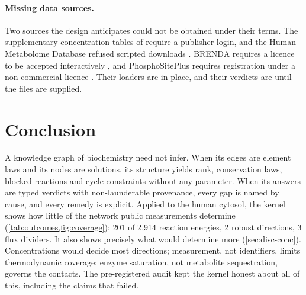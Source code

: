 \paragraph{Missing data sources.}
Two sources the design anticipates could not be obtained under their terms.
The supplementary concentration tables of \citet{park2016concentrations} require a publisher login, and the Human Metabolome Database refused scripted downloads \citep{wishart2022hmdb}.
BRENDA requires a licence to be accepted interactively \citep{chang2021brenda}, and PhosphoSitePlus requires registration under a non-commercial licence \citep{hornbeck2015psp}.
Their loaders are in place, and their verdicts are  until the files are supplied.

\section{Conclusion}
\label{sec:conclusion}

A knowledge graph of biochemistry need not infer.
When its edges are element laws and its nodes are solutions, its structure yields rank, conservation laws, blocked reactions and cycle constraints without any parameter.
When its answers are typed verdicts with non-launderable provenance, every gap is named by cause, and every remedy is explicit.
Applied to the human cytosol, the kernel shows how little of the network public measurements determine (\cref{tab:outcomes,fig:coverage}): 201 of 2{,}914 reaction energies, 2 robust directions, 3 flux dividers.
It also shows precisely what would determine more (\cref{sec:disc-conc}).
Concentrations would decide most directions; measurement, not identifiers, limits thermodynamic coverage; enzyme saturation, not metabolite sequestration, governs the contacts.
The pre-registered audit kept the kernel honest about all of this, including the claims that failed.
